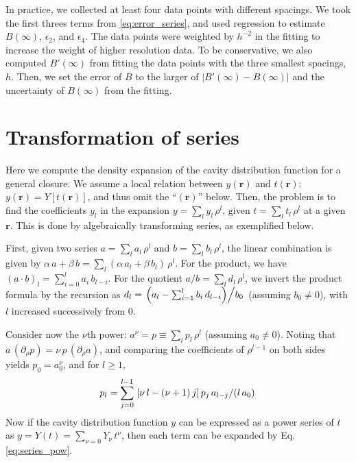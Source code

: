 \documentclass[aip,jcp,preprint,superscriptaddress,showpacs,preprintnumbers,amsmath,amssymb]{revtex4-1}
\numberwithin{equation}{section}
\newcommand{\vct}[1]{\mathbf{#1}}
\providecommand{\vr}{} %
\renewcommand{\vr}{\vct{r}}
\begin{document}
In practice, we collected at least four data points
with different spacings.
%
We took the first threes terms from \eqref{eq:error_series},
and used regression to estimate
$B(\infty)$, $\epsilon_2$, and $\epsilon_4$.
%
The data points were weighted by $h^{-2}$ in the fitting
to increase the weight of higher resolution data.
%
To be conservative,
we also computed $B'(\infty)$ from fitting the data points
with the three smallest spacings, $h$.
%
Then,
we set the error of $B$ to the larger of
%
$\left| B'(\infty) - B(\infty) \right|$
%
and the uncertainty of $B(\infty)$ from the fitting.





\section{\label{sec:series}
Transformation of series}





Here we compute the density expansion of
the cavity distribution function
for a general closure.
%
We assume a local relation between $y(\vr)$ and $t(\vr)$:
$y(\vr) = Y[t(\vr)]$,
and thus omit the ``$(\vr)$'' below.
%
Then, the problem is to find the coefficients $y_l$
in the expansion $y = \sum_l y_l \, \rho^l$,
given $t = \sum_l t_l \, \rho^l$ at a given $\vr$.
%
This is done by algebraically transforming series\cite{
kilpatrick1969, *aldrovandi1980},
as exemplified below.



First,
given two series
$a = \sum_l a_l \, \rho^l$
and
$b = \sum_l b_l \, \rho^l$,
the linear combination is given by
$\alpha \, a + \beta \, b =
\sum_l (\alpha \, a_l + \beta \, b_l) \, \rho^l$.
%
For the product,
we have
$(a \cdot b)_l = \sum_{i = 0}^l a_i \, b_{l - i}$.
%
For the quotient
$a / b = \sum_l d_l \, \rho^l$,
we invert the product formula by the recursion as
%
$d_l =
\left.
  \left( a_l - \sum_{i = 1}^l b_i \, d_{l-i} \right)
\middle/
  b_0
\right.$
%
(assuming $b_0 \ne 0$),
with $l$ increased successively from 0.



Consider now the $\nu$th power:
$a^\nu = p \equiv \sum_l p_l \, \rho^l$
(assuming $a_0 \ne 0$).
%
Noting that
$a \, (\partial_\rho p) = \nu \, p \, (\partial_\rho a)$,
and comparing the coefficients of $\rho^{l - 1}$
on both sides yields
$p_0 = a_0^\nu$,
and for $l \ge 1$,
%
%
%
\begin{equation}
p_l
=
\sum_{j = 0}^{l - 1}
  \left.
    [\nu \, l - (\nu + 1) \, j] \, p_j \, a_{l - j}
  \middle/
    (l \, a_0)
  \right.
\label{eq:series_pow}
\end{equation}
%
%
%
Now if the cavity distribution function $y$
can be expressed as a power series of $t$ as
$y = Y(t) = \sum_{\nu = 0} Y_\nu \, t^\nu$,
then each term can be expanded by Eq. \eqref{eq:series_pow}.
\end{document}
